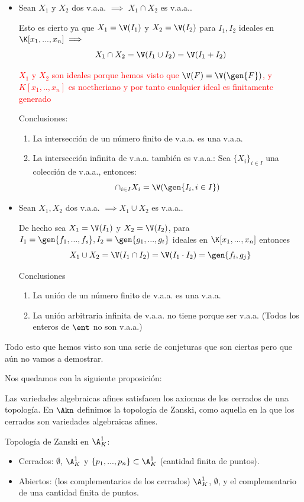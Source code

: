 \begin{itemize}
	\item Sean $X_1$ y $X_2$ dos v.a.a. $\implies$ $X_1 \cap X_2$ es v.a.a..
	
	Esto es cierto ya que $X_1=\V(I_1)$ y $X_2=\V(I_2)$ para $I_1,I_2$ ideales en $\K[x_1,...,x_n] \implies$ 
	$$X_1 \cap X_2 = \V(I_1 \cup I_2)=\V(I_1+I_2)$$
	
	\textcolor{red}{$X_1$ y $X_2$ son ideales porque hemos visto que $\V(F)=\V(\gen{F})$, y $K[x_1,..,x_n]$ es noetheriano y por tanto cualquier ideal es finitamente generado}
	
	Conclusiones:
	\begin{enumerate}
		\item La intersección de un número finito de v.a.a. es una v.a.a.
		\item La intersección infinita de v.a.a. también es v.a.a.: Sea $\{ X_i \}_{i\in I}$ una colección de v.a.a., entonces:
		\[ \cap_{i\in I}X_i = \V(\gen{I_i, i \in I}) \]
	\end{enumerate}
	\item Sean $X_1, X_2$ dos v.a.a. $\implies X_1 \cup X_2$ es v.a.a..
	
	De hecho sea  $X_1=\V(I_1)$ y $X_2=\V(I_2)$,  para $I_1=\gen{f_1,...,f_s},I_2=\gen{g_1,...,g_t}$ ideales en $\K[x_1,...,x_n]$ entonces 
	$$X_1 \cup X_2=\V(I_1 \cap I_2)=\V(I_1 \cdot I_2)=\gen{f_i, g_j}$$
	
	Conclusiones
	\begin{enumerate}
		\item La unión de un número finito de v.a.a. es una v.a.a.
		\item La unión arbitraria infinita de v.a.a. no tiene porque ser v.a.a. (Todos los enteros de $\ent$ no son v.a.a.)
	\end{enumerate}
\end{itemize}

Todo esto que hemos visto son una serie de conjeturas que son ciertas pero que aún no vamos a demostrar.

Nos quedamos con la siguiente proposición: 

\begin{prop}
	Las variedades algebraicas afines satisfacen los axiomas de los cerrados de una topología. En $\Akn$ definimos la topología de Zanski, como aquella en la que los cerrados son variedades algebraicas afines.
\end{prop} 

\begin{example}
	Topología de Zanski en $\A^1_K$:
	\begin{itemize}
		\item Cerrados: $\emptyset$, $\A^1_K$ y $\{ p_1,...,p_n \} \subset \A^1_K$ (cantidad finita de puntos).
		\item Abiertos: (los complementarios de los cerrados) $\A^1_K$, $\emptyset$, y el complementario de una cantidad finita de puntos.
	\end{itemize}
\end{example}

